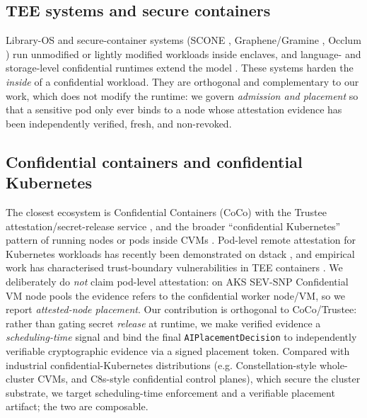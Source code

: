 \subsection{TEE systems and secure containers}
Library-OS and secure-container systems (SCONE \cite{arnautov2016scone},
Graphene/Gramine \cite{tsai2017graphene}, Occlum \cite{shen2020occlum}) run
unmodified or lightly modified workloads inside enclaves, and language- and
storage-level confidential runtimes extend the model
\cite{sarkar2024hastee,hartono2024crisp}. These systems harden the \emph{inside}
of a confidential workload. They are orthogonal and complementary to our work,
which does not modify the runtime: we govern \emph{admission and placement} so
that a sensitive pod only ever binds to a node whose attestation evidence has
been independently verified, fresh, and non-revoked.

\subsection{Confidential containers and confidential Kubernetes}
The closest ecosystem is Confidential Containers (CoCo) with the Trustee
attestation/secret-release service \cite{coco2024}, and the broader
``confidential Kubernetes'' pattern of running nodes or pods inside CVMs
\cite{k8s2023confidential}. Pod-level remote attestation for Kubernetes
workloads has recently been demonstrated on dstack \cite{yang2026dstack}, and
empirical work has characterised trust-boundary vulnerabilities in TEE
containers \cite{liu2025teecontainers}. We deliberately do \emph{not} claim
pod-level attestation: on AKS SEV-SNP Confidential VM node pools the evidence
refers to the confidential worker node/VM, so we report \emph{attested-node
placement}. Our contribution is orthogonal to CoCo/Trustee: rather than
gating secret \emph{release} at runtime, we make verified evidence a
\emph{scheduling-time} signal and bind the final \texttt{AIPlacementDecision} to
independently verifiable cryptographic evidence via a signed placement token.
Compared with industrial confidential-Kubernetes distributions (e.g.
Constellation-style whole-cluster CVMs, and C8s-style confidential control
planes), which secure the cluster substrate, we target scheduling-time
enforcement and a verifiable placement artifact; the two are composable.

